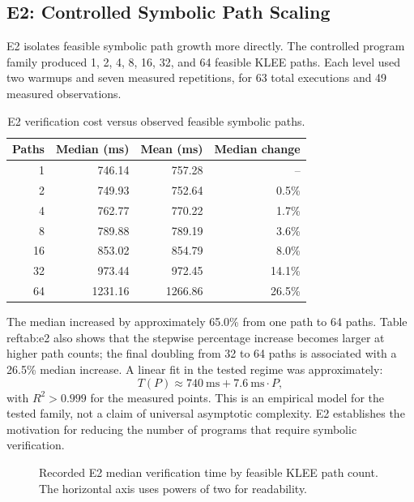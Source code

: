 \documentclass[12pt,a4paper]{article}
\begin{document}
\subsection{E2: Controlled Symbolic Path Scaling}

E2 isolates feasible symbolic path growth more directly. The controlled program family produced 1, 2, 4, 8, 16, 32, and 64 feasible KLEE paths. Each level used two warmups and seven measured repetitions, for 63 total executions and 49 measured observations.

\begin{table}[t]
\centering
\caption{E2 verification cost versus observed feasible symbolic paths.}
\label{tab:e2}
\begin{tabular}{rrrr}
\toprule
Paths & Median (ms) & Mean (ms) & Median change\\
\midrule
1  & 746.14  & 757.28  & --\\
2  & 749.93  & 752.64  & 0.5\%\\
4  & 762.77  & 770.22  & 1.7\%\\
8  & 789.88  & 789.19  & 3.6\%\\
16 & 853.02  & 854.79  & 8.0\%\\
32 & 973.44  & 972.45  & 14.1\%\\
64 & 1231.16 & 1266.86 & 26.5\%\\
\bottomrule
\end{tabular}
\end{table}

The median increased by approximately 65.0\% from one path to 64 paths. Table~\\ref{tab:e2} also shows that the stepwise percentage increase becomes larger at higher path counts; the final doubling from 32 to 64 paths is associated with a 26.5\% median increase. A linear fit in the tested regime was approximately:
\[
T(P) \approx 740\ \mathrm{ms} + 7.6\ \mathrm{ms}\cdot P,
\]
with $R^2>0.999$ for the measured points. This is an empirical model for the tested family, not a claim of universal asymptotic complexity. E2 establishes the motivation for reducing the number of programs that require symbolic verification.

\begin{figure}[htbp]
\centering
{}
\caption{Recorded E2 median verification time by feasible KLEE path count. The horizontal axis uses powers of two for readability.}
\label{fig:e2-scaling}
\end{figure}
\end{document}
